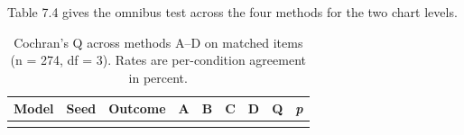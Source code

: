 Table 7.4 gives the omnibus test across the four methods for the two chart levels.

\begin{landscape}
\begingroup\scriptsize\setlength{\tabcolsep}{1pt}\sloppy
\begin{longtable}[]{@{}
  >{\raggedright\arraybackslash}p{}
  >{\raggedleft\arraybackslash}p{}
  >{\raggedright\arraybackslash}p{}
  >{\raggedleft\arraybackslash}p{}
  >{\raggedleft\arraybackslash}p{}
  >{\raggedleft\arraybackslash}p{}
  >{\raggedleft\arraybackslash}p{}
  >{\raggedleft\arraybackslash}p{}
  >{\raggedleft\arraybackslash}p{}@{}}
\caption{Cochran's Q across methods A--D on matched items (n = 274, df = 3). Rates are per-condition agreement in percent.}\tabularnewline
\toprule\noalign{}
\begin{minipage}[b]{\linewidth}\raggedright
Model
\end{minipage} & \begin{minipage}[b]{\linewidth}\raggedleft
Seed
\end{minipage} & \begin{minipage}[b]{\linewidth}\raggedright
Outcome
\end{minipage} & \begin{minipage}[b]{\linewidth}\raggedleft
A
\end{minipage} & \begin{minipage}[b]{\linewidth}\raggedleft
B
\end{minipage} & \begin{minipage}[b]{\linewidth}\raggedleft
C
\end{minipage} & \begin{minipage}[b]{\linewidth}\raggedleft
D
\end{minipage} & \begin{minipage}[b]{\linewidth}\raggedleft
Q
\end{minipage} & \begin{minipage}[b]{\linewidth}\raggedleft
\emph{p}
\end{minipage} \\
\midrule\noalign{}
\endfirsthead
\toprule\noalign{}
\begin{minipage}[b]{\linewidth}\raggedright

\end{minipage}
\end{longtable}
\end{landscape}
